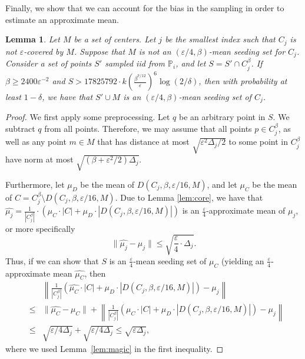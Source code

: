\documentclass[10pt,a4paper]{amsart}
\newtheorem{lemma}[theorem]{Lemma}
\begin{document}
Finally, we show that we can account for the bias in the sampling in order to estimate an approximate mean.
\begin{lemma}
\label{lem:weightedmeans}
    Let $M$ be a set of centers. Let $j$ be the smallest index such that $C_j$ is not $\varepsilon$-covered by $M$. 
    Suppose that $M$ is not an $(\varepsilon/4,\beta)$-mean seeding set for $C_j$.
    Consider a set of points $S'$ sampled iid from $\mathbb{P}_i$, and let $S = S'\cap C_j^\beta$.
    If $\beta \geq 2400\varepsilon^{-2}$ and $S> 17825792 \cdot k\left(\frac{\beta^{7/12}}{\varepsilon}\right)^6 \log(2/\delta)$, then 
    with probability at least $1-\delta$, we have that $S'\cup M$ is an $(\varepsilon/4,\beta)$-mean seeding set of $C_j$.
\end{lemma}
\begin{proof}
    We first apply some preprocessing. Let $q$ be an arbitrary point in $S$. We subtract $q$ from all points. 
    Therefore, we may assume that all points $p\in C_j^\beta$, as well as any point $m\in M$ that has distance at most $\sqrt{\varepsilon^2 \Delta_j/2}$ to some point in $C_j^\beta$ have norm at most $\sqrt{(\beta+\varepsilon^2/2)\Delta_j}$.

    Furthermore, let $\mu_D$ be the mean of $D(C_j,\beta,\varepsilon/16,M)$, and let $\mu_C$ be the mean of $C=C_j^\beta\setminus D(C_j,\beta,\varepsilon/16,M)$.
    Due to Lemma \ref{lem:core}, we have that $\hat{\mu_j} = \frac{1}{|C_j^\beta|}\cdot\left(\mu_C\cdot |C| + \mu_D\cdot |D(C_j,\beta,\varepsilon/16,M)|\right)$ is an $\frac{\varepsilon}{4}$-approximate mean of $\mu_j$, or more specifically
    $$\|\hat{\mu_j}-\mu_j\|\leq \sqrt{\frac{\varepsilon}{4}\cdot \Delta_j}.$$
    Thus, if we can show that $S$ is an $\frac{\varepsilon}{4}$-mean seeding set of $\mu_C$ (yielding an
    $\frac{\varepsilon}{4}$-approximate mean $\widehat{\mu_C}$, then
    \begin{eqnarray*}
    & &\left\|\frac{1}{|C_j^\beta|}\left(\widehat{\mu_C}\cdot |C| + \mu_D\cdot |D(C_j,\beta,\varepsilon/16,M)|\right)-\mu_j\right\|  \\
    &\leq&  \|\widehat{\mu_C}-\mu_C\| + \left\|\frac{1}{|C_j^\beta|} \left(\mu_C\cdot |C| + \mu_D\cdot |D(C_j,\beta,\varepsilon/16,M)|\right)-\mu_j\right\|\\
    &\leq& \sqrt{\varepsilon/4\Delta_j} + \sqrt{\varepsilon/4\Delta_j} \leq \sqrt{\varepsilon\Delta_j},
    \end{eqnarray*}
    where we used Lemma~\ref{lem:magic} in the first inequality.


\end{proof}
\end{document}
